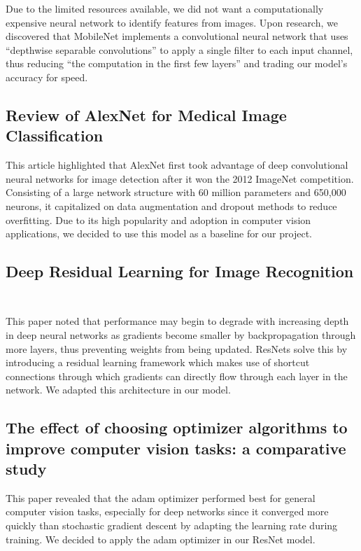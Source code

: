 Due to the limited resources available, we did not want a computationally expensive neural network to identify features from images. Upon research, we discovered that MobileNet implements a convolutional neural network that uses “depthwise separable convolutions” to apply a single filter to each input channel, thus reducing “the computation in the first few layers” and trading our model’s accuracy for speed.

\subsection{Review of AlexNet for Medical Image Classification~\citep{tang2023review}}

This article highlighted that AlexNet first took advantage of deep convolutional neural networks for image detection after it won the 2012 ImageNet competition. Consisting of a large network structure with 60 million parameters and 650,000 neurons, it capitalized on data augmentation and dropout methods to reduce overfitting. Due to its high popularity and adoption in computer vision applications, we decided to use this model as a baseline for our project.

\subsection{Deep Residual Learning for Image Recognition
	~\citep{he2015deep}}

This paper noted that performance may begin to degrade with increasing depth in deep neural networks as gradients become smaller by backpropagation through more layers, thus preventing weights from being updated. ResNets solve this by introducing a residual learning framework which makes use of shortcut connections through which gradients can directly flow through each layer in the network. We adapted this architecture in our model.

\subsection{The effect of choosing optimizer algorithms to improve computer vision tasks: a comparative study~\citep{Hassan}}

This paper revealed that the adam optimizer performed best for general computer vision tasks, especially for deep networks since it converged more quickly than stochastic gradient descent by adapting the learning rate during training. We decided to apply the adam optimizer in our ResNet model.


